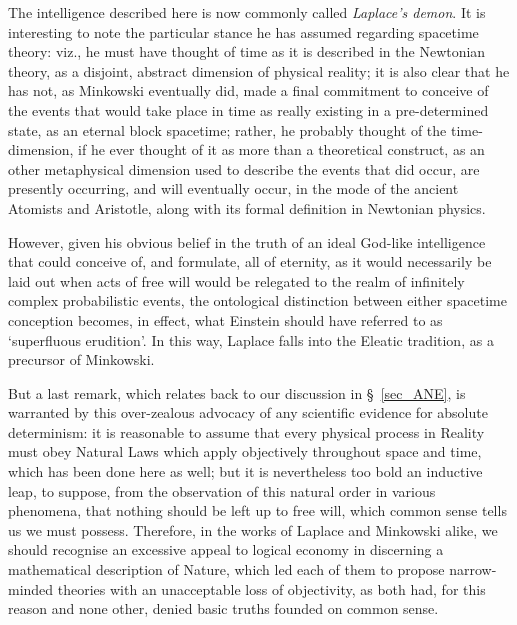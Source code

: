 The intelligence described here is now commonly called \textit{Laplace's demon}. It is interesting to note the particular stance he has assumed regarding spacetime theory: viz., he must have thought of time as it is described in the Newtonian theory, as a disjoint, abstract dimension of physical reality; it is also clear that he has not, as Minkowski eventually did, made a final commitment to conceive of the events that would take place in time as really existing in a pre-determined state, as an eternal block spacetime; rather, he probably thought of the time-dimension, if he ever thought of it as more than a theoretical construct, as an other metaphysical dimension used to describe the events that did occur, are presently occurring, and will eventually occur, in the mode of the ancient Atomists and Aristotle, along with its formal definition in Newtonian physics. 

However, given his obvious belief in the truth of an ideal God-like intelligence that could conceive of, and formulate, all of eternity, as it would necessarily be laid out when acts of free will would be relegated to the realm of infinitely complex probabilistic events, the ontological distinction between either spacetime conception becomes, in effect, what Einstein should have referred to as `superfluous erudition'. In this way, Laplace falls into the Eleatic tradition, as a precursor of Minkowski.

But a last remark, which relates back to our discussion in \S~\ref{sec_ANE}, is warranted by this over-zealous advocacy of any scientific evidence for absolute determinism: it is reasonable to assume that every physical process in Reality must obey Natural Laws which apply objectively throughout space and time, which has been done here as well; but it is nevertheless too bold an inductive leap, to suppose, from the observation of this natural order in various phenomena, that nothing should be left up to free will, which common sense tells us we must possess. Therefore, in the works of Laplace and Minkowski alike, we should recognise an excessive appeal to logical economy in discerning a mathematical description of Nature, which led each of them to propose narrow-minded theories with an unacceptable loss of objectivity, as both had, for this reason and none other, denied basic truths founded on common sense.